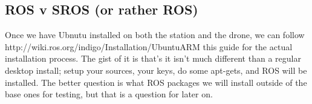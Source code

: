 \documentclass[IEEEtran,letterpaper,10pt,titlepage,draftclsnofoot,onecolumn]{article}
\begin{document}
\subsection*{ROS v SROS (or rather ROS)}
Once we have Ubnutu installed on both the station and the drone, we can follow http://wiki.ros.org/indigo/Installation/UbuntuARM this guide for the actual installation process.
The gist of it is that's it isn't much different than a regular desktop install; setup your sources, your keys, do some apt-gets, and ROS will be installed. 
The better question is what ROS packages we will install outside of the base ones for testing, but that is a question for later on. 



\end{document}

